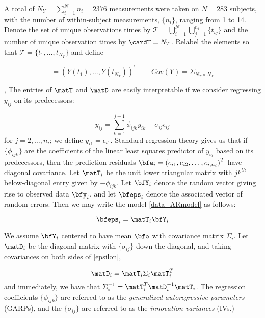 A total of $N_Y = \sum_{i=1}^N n_i = 2376$ measurements were taken on $N=283$ subjects, with the number of within-subject measurements, $\lbrace n_i \rbrace$, ranging from 1 to 14.  Denote the set of unique observations times by $ \mathcal{T} = \bigcup_{i=1}^N \bigcup_{j=1}^{n_i} \lbrace t_{ij} \rbrace$ and the number of unique observation times by $\cardT = N_T$. Relabel the elements so that $\mathcal{T} = \lbrace t_1, \dots, t_{N_T} \rbrace$ and define

\[
 = \left(Y\left(t_1\right) , \dots, Y\left(t_{N_T} \right)\right)^\prime\;\;\;\;\;\;\;\; Cov\left(Y\right) = \Sigma_{N_T \times N_T}
\]


, 
The entries of $\matT$ and $\matD$ are easily interpretable if we consider regressing $y_{ij}$ on its predecessors: 

\begin{equation}
{y}_{ij}  = \sum_{k=1}^{j-1} \phi_{ijk} y_{ik} + \sigma_{ij}\epsilon_{ij} \label{data_ARmodel}
\end{equation}
\noindent
for $j=2,\dots,n_i$; we define $y_{i1}=\epsilon_{i1}$. Standard regression theory gives us that if $\lbrace \phi_{ijk} \rbrace$ are the coefficients of the linear least squares predictor of $y_{ij}$ based on its predecessors, then the prediction residuals $\bfe_i =\left( e_{i1}, e_{i2},\dots, e_{i,n_i} \right)^T$ have diagonal covariance. Let $\matT_i$ be the unit lower triangular matrix with $jk^{th}$ below-diagonal entry given by $-\phi_{ijk}$. Let $\bfY_i$ denote the random vector giving rise to observed data $\bfy_i$, and let $\bfeps_i$ denote the associated vector of random errors. Then we may write the model \eqref{data_ARmodel} as follows: 

\begin{equation}
\bfeps_i = \matT_i \bfY_i \label{epsilon}
\end{equation}

We assume $\bfY_i$ centered to have mean $\bfo$ with covariance matrix $\Sigma_i$. Let $\matD_i$ be the diagonal matrix with $\lbrace \sigma_{ij} \rbrace$ down the diagonal, and taking covariances on both sides of \eqref{epsilon}, 

\begin{equation}
\nonumber
\matD_i = \matT_i \Sigma_i \matT_i^T
\end{equation} 
\noindent
and immediately, we have that $\Sigma_i^{-1} = \matT_i^T \matD_i^{-1} \matT_i$. The regression coefficients $\lbrace \phi_{ijk} \rbrace$ are referred to as the \emph{generalized autoregressive parameters} (GARPs), and the $\lbrace \sigma_{ij} \rbrace$ are referred to as the \emph{innovation variances} (IVs.) 

